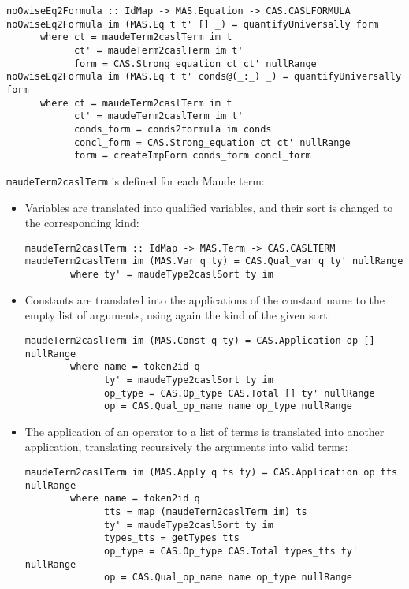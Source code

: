 {\codesize
\begin{verbatim}
noOwiseEq2Formula :: IdMap -> MAS.Equation -> CAS.CASLFORMULA
noOwiseEq2Formula im (MAS.Eq t t' [] _) = quantifyUniversally form
      where ct = maudeTerm2caslTerm im t
            ct' = maudeTerm2caslTerm im t'
            form = CAS.Strong_equation ct ct' nullRange
noOwiseEq2Formula im (MAS.Eq t t' conds@(_:_) _) = quantifyUniversally form
      where ct = maudeTerm2caslTerm im t
            ct' = maudeTerm2caslTerm im t'
            conds_form = conds2formula im conds
            concl_form = CAS.Strong_equation ct ct' nullRange
            form = createImpForm conds_form concl_form
\end{verbatim}
}

\verb"maudeTerm2caslTerm" is defined for each Maude term:

\begin{itemize}

\item Variables are translated into qualified \CASL variables, and their
sort is changed to the corresponding kind:

{\codesize
\begin{verbatim}
maudeTerm2caslTerm :: IdMap -> MAS.Term -> CAS.CASLTERM
maudeTerm2caslTerm im (MAS.Var q ty) = CAS.Qual_var q ty' nullRange
        where ty' = maudeType2caslSort ty im
\end{verbatim}
}

\item Constants are translated into the applications of the constant
name to the empty list of arguments, using again the kind of the
given sort:

{\codesize
\begin{verbatim}
maudeTerm2caslTerm im (MAS.Const q ty) = CAS.Application op [] nullRange
        where name = token2id q
              ty' = maudeType2caslSort ty im
              op_type = CAS.Op_type CAS.Total [] ty' nullRange
              op = CAS.Qual_op_name name op_type nullRange
\end{verbatim}
}

\item The application of an operator to a list of terms is translated
into another application, translating recursively the arguments into
valid \CASL terms:

{\codesize
\begin{verbatim}
maudeTerm2caslTerm im (MAS.Apply q ts ty) = CAS.Application op tts nullRange
        where name = token2id q
              tts = map (maudeTerm2caslTerm im) ts
              ty' = maudeType2caslSort ty im
              types_tts = getTypes tts
              op_type = CAS.Op_type CAS.Total types_tts ty' nullRange
              op = CAS.Qual_op_name name op_type nullRange
\end{verbatim}
}

\end{itemize}

